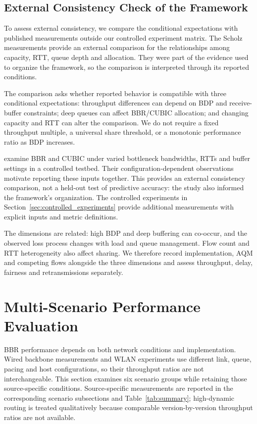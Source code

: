 \documentclass[a4paper,fleqn]{cas-sc}
\begin{document}


\subsection{External Consistency Check of the Framework}
\label{sec:framework_valid}

To assess external consistency, we compare the conditional expectations
with published measurements outside our controlled experiment matrix.
The Scholz measurements provide an external comparison for the relationships
among capacity, RTT, queue depth and allocation. They were part of the
evidence used to organize the framework, so the comparison is interpreted
through its reported conditions.

The comparison asks whether reported behavior is compatible with three
conditional expectations: throughput differences can depend on BDP and
receive-buffer constraints; deep queues can affect BBR/CUBIC allocation;
and changing capacity and RTT can alter the comparison. We do not require
a fixed throughput multiple, a universal share threshold, or a monotonic
performance ratio as BDP increases.

\citet{scholz2018deeper} examine BBR and CUBIC under varied bottleneck
bandwidths, RTTs and buffer settings in a controlled testbed. Their
configuration-dependent observations motivate reporting these inputs
together. This provides an external consistency comparison, not a held-out
test of predictive accuracy: the study also informed the framework's
organization. The controlled experiments in Section~\ref{sec:controlled_experiments}
provide additional measurements with explicit inputs and metric definitions.

The dimensions are related: high BDP and deep buffering can co-occur,
and the observed loss process changes with load and queue management.
Flow count and RTT heterogeneity also affect sharing. We therefore record
implementation, AQM and competing flows alongside the three dimensions
and assess throughput, delay, fairness and retransmissions separately.

\section{Multi-Scenario Performance Evaluation}
\label{sec:comparison}

BBR performance depends on both network conditions and implementation.
Wired backbone measurements and WLAN experiments use different link,
queue, pacing and host configurations, so their throughput ratios are
not interchangeable. This section examines six scenario groups while
retaining those source-specific conditions. Source-specific
measurements are reported in the corresponding scenario subsections and
Table~\ref{tab:summary}; high-dynamic routing is treated
qualitatively because comparable version-by-version throughput ratios are not
available.
\end{document}

